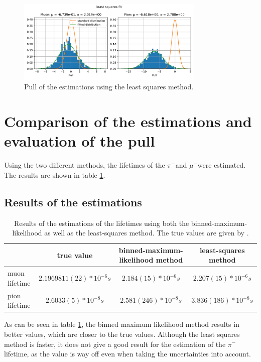 \documentclass[11pt, a4paper, oneside]{book}
\newcommand\Plotwidth{0.8}
\newcommand{\pion}{$\pi^{-}$}
\newcommand{\muon}{$\mu^{-}$}
\begin{document}
\begin{figure}[H]
  \centering
  \includegraphics[width=\Plotwidth\textwidth]{images/estimators_pull_least_squares.pdf}
  \caption{Pull of the estimations using the least squares method.}
  \label{fig:pull_least_squares_method}
\end{figure}

\section{Comparison of the estimations and evaluation of the pull}
Using the two different methods, the lifetimes of the \pion and \muon were estimated. The results are shown in table \ref{tab:results}.

\subsection{Results of the estimations}

\begin{table}[H]
  \begin{tabular}{l|ccc}
                & true value & binned-maximum-likelihood method & least-squares method \\ \hline
  muon lifetime & $2.1969811(22)*10^{-6}\si{s}$ & $2.184(15)*10^{-6}\si{s}$ & $2.207(15)*10^{-6}\si{s}$ \\
  pion lifetime & $2.6033(5)*10^{-8}\si{s}$ & $2.581(246)*10^{-8}\si{s}$ & $3.836(186)*10^{-8}\si{s}$                    
  \end{tabular}
  \caption{Results of the estimations of the lifetimes using both the binned-maximum-likelihood as well as the least-squares method. The true values are given by \cite{ParticleDataGroup:2024cfk}.}
  \label{tab:results}
\end{table}

As can be seen in table \ref{tab:results}, the binned maximum likelihood method results in better values, which are closer to the true values. Although the least squares method is faster, it does not give a good result for the estimation of the \pion lifetime, as the value is way off even when taking the uncertainties into account.
\end{document}
